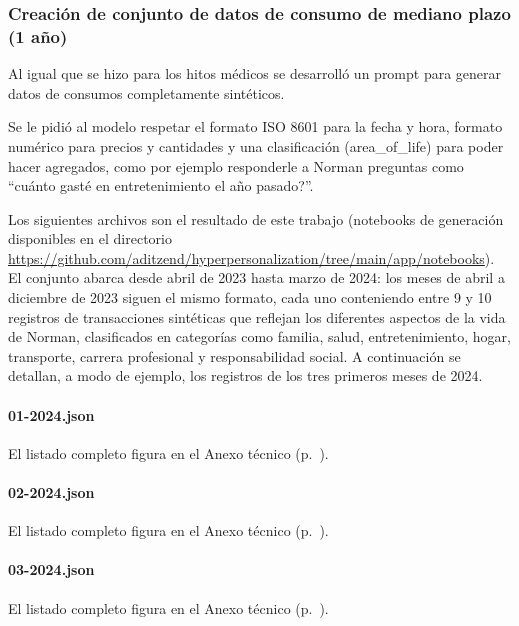 \subsubsection{Creación de conjunto de datos de consumo de mediano plazo (1 año)}

Al igual que se hizo para los hitos médicos se desarrolló un prompt para generar datos de consumos completamente sintéticos.

Se le pidió al modelo respetar el formato ISO 8601 para la fecha y hora, formato numérico para precios y cantidades y una clasificación (area\_of\_life) para poder hacer agregados, como por ejemplo responderle a Norman preguntas como ``cuánto gasté en entretenimiento el año pasado?''.

Los siguientes archivos son el resultado de este trabajo (notebooks de generación disponibles en el directorio \url{https://github.com/aditzend/hyperpersonalization/tree/main/app/notebooks}). El conjunto abarca desde abril de 2023 hasta marzo de 2024: los meses de abril a diciembre de 2023 siguen el mismo formato, cada uno conteniendo entre 9 y 10 registros de transacciones sintéticas que reflejan los diferentes aspectos de la vida de Norman, clasificados en categorías como familia, salud, entretenimiento, hogar, transporte, carrera profesional y responsabilidad social. A continuación se detallan, a modo de ejemplo, los registros de los tres primeros meses de 2024.

\paragraph{01-2024.json}

El listado completo figura en el Anexo técnico (p.~\pageref{anexo:code-4-3-3-1}).

\paragraph{02-2024.json}

El listado completo figura en el Anexo técnico (p.~\pageref{anexo:code-4-3-3-2}).

\paragraph{03-2024.json}

El listado completo figura en el Anexo técnico (p.~\pageref{anexo:code-4-3-3-3}).